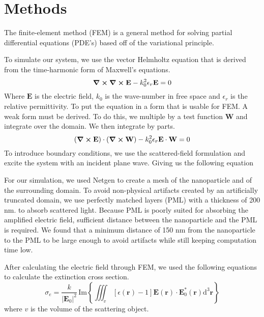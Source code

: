 \documentclass{article}
\begin{document}
\section{Methods}
    The finite-element method (FEM) is a general method for solving partial differential equations (PDE's) based off of the variational principle. 

    To simulate our system, we use the vector Helmholtz equation that is derived from the time-harmonic form of Maxwell's equations. 
    \begin{equation}
        \curl \curl \textbf{E} - k_0^2\epsilon_r\textbf{E} = 0
    \end{equation}
    Where \(\textbf{E}\) is the electric field, \(k_0\) is the wave-number in free space and \(\epsilon_r\) is the relative permittivity. To put the equation in a form that is usable for FEM. A weak form must be derived. To do this, we multiple by a test function \(\textbf{W}\) and integrate over the domain. We then integrate by parts. \cite{jinFiniteElementMethod2014,jinFiniteElementAnalysis2009}
    \begin{equation}
        (\curl \textbf{E}) \cdot (\curl \textbf{W}) - k_0^2 \epsilon_r \textbf{E} \cdot \textbf{W} = 0
    \end{equation}
    To introduce boundary conditions, we use the scattered-field formulation and excite the system with an incident plane wave. \cite{jinFiniteElementMethod2014} Giving us the following equation

    For our simulation, we used Netgen to create a mesh of the nanoparticle and of the surrounding domain. To avoid non-physical artifacts created by an artificially truncated domain, we use perfectly matched layers (PML) with a thickness of 200 nm. to absorb scattered light. Because PML is poorly suited for absorbing the amplified electric field, sufficient distance between the nanoparticle and the PML is required. We found that a minimum distance of 150 nm from the nanoparticle to the PML to be large enough to avoid artifacts while still keeping computation time low. 

    After calculating the electric field through FEM, we used the following equations to calculate the extinction cross section. \cite{mcmahonGoldNanoparticleDimer2009,yangFinitedifferenceTimeDomain1996}
    \begin{equation}
        \sigma_e = \frac{k}{|\textbf{E}_0|^2}\, \text{Im}\left\{\iiint_v  \, [\epsilon(\textbf{r}) - 1] \textbf{E}(\textbf{r}) \cdot \textbf{E}_0^*(\textbf{r}) \mathrm{d}^3\textbf{r}  \right\}
    \end{equation}
    where \(v\) is the volume of the scattering object.


\end{document}
